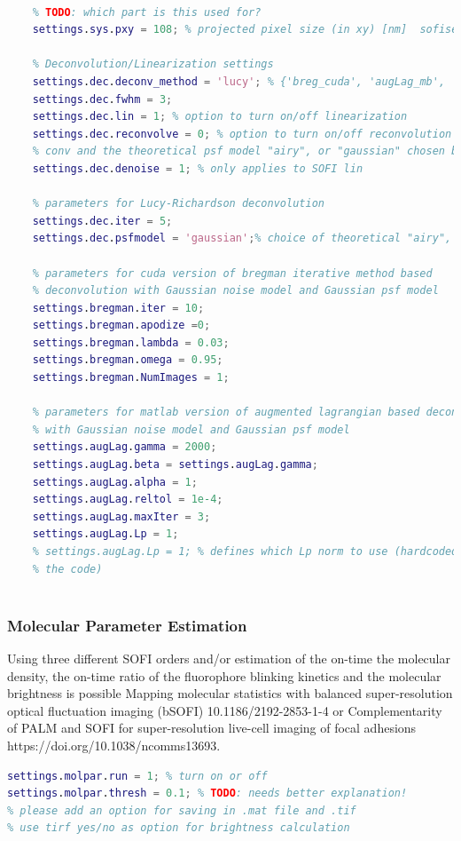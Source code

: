 \documentclass[final]{scrartcl}
\begin{document}
\begin{lstlisting}[language=Matlab]
    % POST PROCESSING SETTINGS

    % TODO: which part is this used for?
    settings.sys.pxy = 108; % projected pixel size (in xy) [nm]  sofisetup = 96.0384, Hendriksetup = 104.8, AD-gut setup = 108

    % Deconvolution/Linearization settings
    settings.dec.deconv_method = 'lucy'; % {'breg_cuda', 'augLag_mb', 'lucy'}
    settings.dec.fwhm = 3;
    settings.dec.lin = 1; % option to turn on/off linearization
    settings.dec.reconvolve = 0; % option to turn on/off reconvolution using 
    % conv and the theoretical psf model "airy", or "gaussian" chosen below
    settings.dec.denoise = 1; % only applies to SOFI lin

    % parameters for Lucy-Richardson deconvolution
    settings.dec.iter = 5;
    settings.dec.psfmodel = 'gaussian';% choice of theoretical "airy", or "gaussian"

    % parameters for cuda version of bregman iterative method based
    % deconvolution with Gaussian noise model and Gaussian psf model
    settings.bregman.iter = 10;
    settings.bregman.apodize =0;
    settings.bregman.lambda = 0.03;
    settings.bregman.omega = 0.95;
    settings.bregman.NumImages = 1;

    % parameters for matlab version of augmented lagrangian based deconvolution
    % with Gaussian noise model and Gaussian psf model
    settings.augLag.gamma = 2000;
    settings.augLag.beta = settings.augLag.gamma;
    settings.augLag.alpha = 1;
    settings.augLag.reltol = 1e-4;
    settings.augLag.maxIter = 3;
    settings.augLag.Lp = 1;
    % settings.augLag.Lp = 1; % defines which Lp norm to use (hardcoded to 1 in
    % the code)
    
\end{lstlisting}

\subsubsection*{Molecular Parameter Estimation}
Using three different SOFI orders and/or estimation of the on-time the molecular density, the on-time ratio of the fluorophore blinking kinetics and the molecular brightness is possible Mapping molecular statistics with balanced super-resolution optical fluctuation imaging (bSOFI) 10.1186/2192-2853-1-4 or Complementarity of PALM and SOFI for super-resolution live-cell imaging of focal adhesions https://doi.org/10.1038/ncomms13693. 
\begin{lstlisting}[language=Matlab]
% Molecular parameters
settings.molpar.run = 1; % turn on or off
settings.molpar.thresh = 0.1; % TODO: needs better explanation!
% please add an option for saving in .mat file and .tif
% use tirf yes/no as option for brightness calculation
\end{lstlisting}
\end{document}
